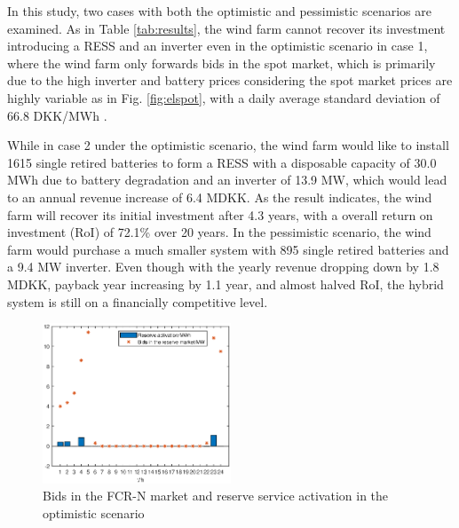 \documentclass[final,5p,times,twocolumn,authoryear]{elsarticle}
\begin{document}
In this study, two cases with both the optimistic and pessimistic scenarios are examined. As in Table \ref{tab:results}, the wind farm cannot recover its investment introducing a RESS and an inverter even in the optimistic scenario in case 1, where the wind farm only forwards bids in the spot market, which is primarily due to the high inverter and battery prices considering the spot market prices are highly variable as in Fig. \ref{fig:elspot}, with a daily average standard deviation of 66.8 DKK/MWh .

While in case 2 under the optimistic scenario, the wind farm would like to install 1615 single retired batteries to form a RESS with a disposable capacity of 30.0 MWh due to battery degradation and an inverter of 13.9 MW, which would lead to an annual revenue increase of 6.4 MDKK. As the result indicates, the wind farm will recover its initial investment after 4.3 years, with a overall return on investment (RoI) of 72.1\% over 20 years. In the pessimistic scenario, the wind farm would purchase a much smaller system with 895 single retired batteries and a 9.4 MW inverter. Even though with the yearly revenue dropping down by 1.8 MDKK, payback year increasing by 1.1 year, and almost halved RoI, the hybrid system is still on a financially competitive level. 
\begin{figure}[h]
    \centering
    \includegraphics[width = 0.5\textwidth,height =0.25\textwidth ]{figures/reserveActi.eps}
    \caption{Bids in the FCR-N market and reserve service activation in the optimistic scenario}
    \label{fig:reserveActi}
\end{figure}
\end{document}
